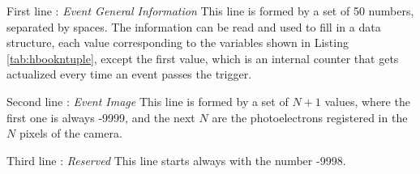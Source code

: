 \begin{Uentry}
  
\item[First line : \emph{Event General Information}] This line is
  formed by a set of 50 numbers, separated by spaces. The information
  can be read and used to fill in a data structure, each value
  corresponding to the variables shown in Listing
  \ref{tab:hbookntuple}, except the first value, which is an internal
  counter that gets actualized every time an event passes the trigger.
  
\item[Second line : \emph{Event Image}] This line is formed by a set
  of $N+1$ values, where the first one is always -9999, and the next
  $N$ are the photoelectrons registered in the $N$ pixels of the
  camera.

\item[Third line : \emph{Reserved}] This line starts always with the
  number -9998.

\end{Uentry}

